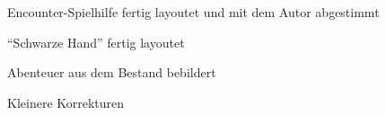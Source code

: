 \documentclass[openright]{Ilaris}
\begin{document}
Encounter-Spielhilfe fertig layoutet und mit dem Autor abgestimmt

\enquote{Schwarze Hand} fertig layoutet

Abenteuer aus dem Bestand bebildert

Kleinere Korrekturen

%
%
%
%
%
%
%
%
%
%
%
%
%

%
%

%
%




\platz

\end{document}
